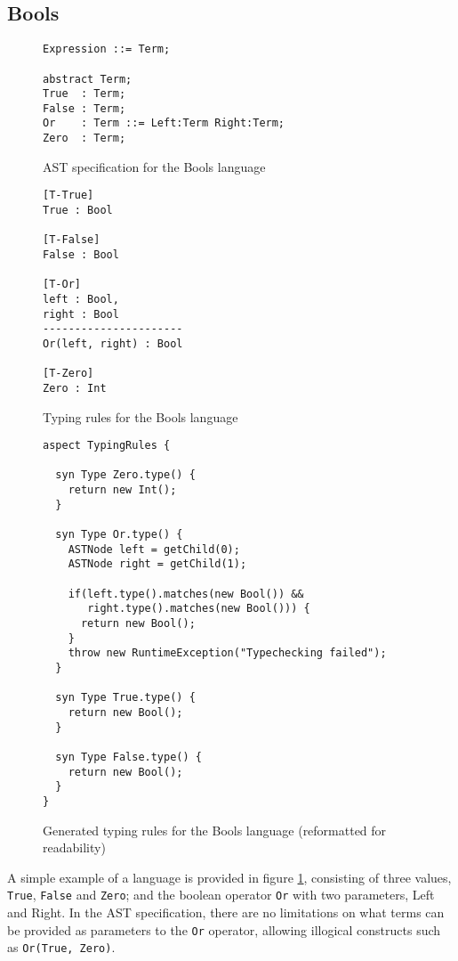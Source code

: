 \documentclass[nofilelist]{cslthse-msc}
\begin{document}
\subsection{Bools}

\begin{figure}[h]
\begin{lstlisting}[]
Expression ::= Term;

abstract Term;
True  : Term;
False : Term;
Or    : Term ::= Left:Term Right:Term;
Zero  : Term;
\end{lstlisting}
  \caption{AST specification for the Bools language}
  \label{boolsast}
\end{figure}
\begin{figure}[h]
\begin{lstlisting}[]
[T-True]
True : Bool

[T-False]
False : Bool

[T-Or]
left : Bool,
right : Bool
----------------------
Or(left, right) : Bool

[T-Zero]
Zero : Int
\end{lstlisting}
  \caption{Typing rules for the Bools language}
  \label{boolstr}
\end{figure}

\begin{figure}[h]
\begin{lstlisting}[language=jrag] 
aspect TypingRules {

  syn Type Zero.type() {
    return new Int();
  }

  syn Type Or.type() {
    ASTNode left = getChild(0);
    ASTNode right = getChild(1);

    if(left.type().matches(new Bool()) &&
       right.type().matches(new Bool())) {
      return new Bool();
    }
    throw new RuntimeException("Typechecking failed");
  }

  syn Type True.type() {
    return new Bool();
  }

  syn Type False.type() {
    return new Bool();
  }
}
\end{lstlisting}
  \caption{Generated typing rules for the Bools language (reformatted for readability)}
  \label{boolstrgen}
\end{figure}
A simple example of a language is provided in figure \ref{boolsast}, consisting of three values, \verb|True|, \verb|False| and \verb|Zero|; and the boolean operator \verb|Or| with two parameters, Left and Right.
In the AST specification, there are no limitations on what terms can be provided as parameters to the \verb|Or| operator, allowing illogical constructs such as \verb|Or(True, Zero)|.
\end{document}

